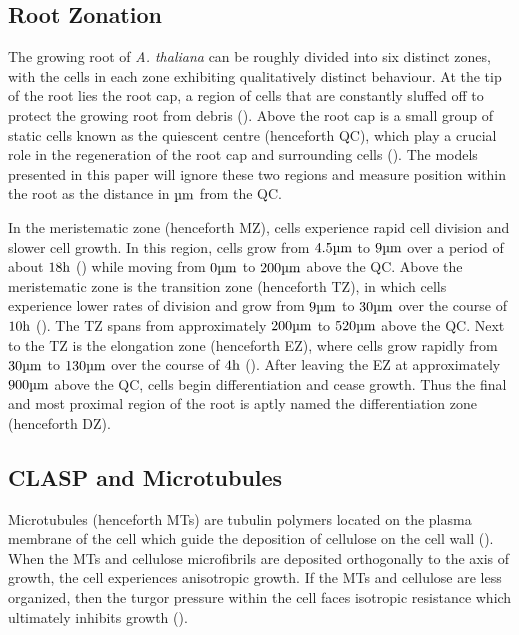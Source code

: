 \subsection{Root Zonation}

The growing root of \emph{A. thaliana} can be roughly divided into six distinct zones, with the cells in each zone exhibiting qualitatively distinct behaviour. At the tip of the root lies the root cap, a region of cells that are constantly sluffed off to protect the growing root from debris (\cite{kumpf2015}). Above the root cap is a small group of static cells known as the quiescent centre (henceforth QC), which play a crucial role in the regeneration of the root cap and surrounding cells (\cite{matosevich2021}). The models presented in this paper will ignore these two regions and measure position within the root as the distance in $\um$ from the QC. 

\medskip

In the meristematic zone (henceforth MZ), cells experience rapid cell division and slower cell growth. In this region, cells grow from $4.5\um$ to $9\um$ over a period of about $18\h$ (\cite{verbelen2006}) while moving from $0\um$ to $200\um$ above the QC. Above the meristematic zone is the transition zone (henceforth TZ), in which cells experience lower rates of division and grow from $9\um$ to $30\um$ over the course of $10\h$ (\cite{verbelen2006}). The TZ spans from approximately $200\um$ to $520\um$ above the QC. Next to the TZ is the elongation zone (henceforth EZ), where cells grow rapidly from $30\um$ to $130\um$ over the course of $4\h$ (\cite{verbelen2006}). After leaving the EZ at approximately $900\um$ above the QC, cells begin differentiation and cease growth. Thus the final and most proximal region of the root is aptly named the differentiation zone (henceforth DZ).

\subsection{CLASP and Microtubules}

Microtubules (henceforth MTs) are tubulin polymers located on the plasma membrane of the cell which guide the deposition of cellulose on the cell wall (\cite{hamant2010}). When the MTs and cellulose microfibrils are deposited orthogonally to the axis of growth, the cell experiences anisotropic growth. If the MTs and cellulose are less organized, then the turgor pressure within the cell faces isotropic resistance which ultimately inhibits growth (\cite{hamant2010}).

